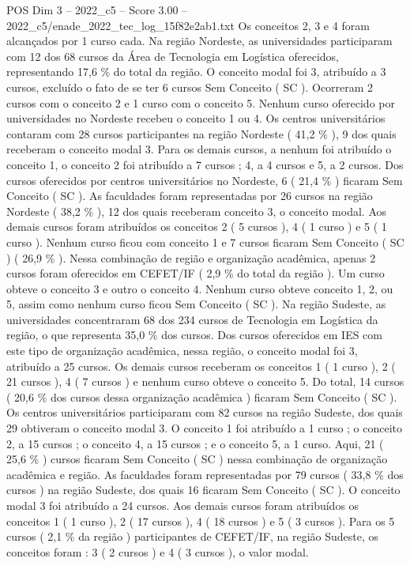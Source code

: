 \begin{textsample}{POS Dim 3 – 2022\_c5 – Score 3.00 – 2022\_c5/enade\_2022\_tec\_log\_15f82e2ab1.txt}
Os conceitos 2, 3 e 4 foram alcançados por 1 curso cada.
Na região Nordeste, as universidades participaram com 12 dos 68 cursos da Área de Tecnologia em Logística oferecidos, representando 17,6 \% do total da região.
O conceito modal foi 3, atribuído a 3 cursos, excluído o fato de se ter 6 cursos Sem Conceito ( SC ).
Ocorreram 2 cursos com o conceito 2 e 1 curso com o conceito 5.
Nenhum curso oferecido por universidades no Nordeste recebeu o conceito 1 ou 4.
Os centros universitários contaram com 28 cursos participantes na região Nordeste ( 41,2 \% ), 9 dos quais receberam o conceito modal 3.
Para os demais cursos, a nenhum foi atribuído o conceito 1, o conceito 2 foi atribuído a 7 cursos ; 4, a 4 cursos e 5, a 2 cursos.
Dos cursos oferecidos por centros universitários no Nordeste, 6 ( 21,4 \% ) ficaram Sem Conceito ( SC ).
As faculdades foram representadas por 26 cursos na região Nordeste ( 38,2 \% ), 12 dos quais receberam conceito 3, o conceito modal.
Aos demais cursos foram atribuídos os conceitos 2 ( 5 cursos ), 4 ( 1 curso ) e 5 ( 1 curso ).
Nenhum curso ficou com conceito 1 e 7 cursos ficaram Sem Conceito ( SC ) ( 26,9 \% ).
Nessa combinação de região e organização acadêmica, apenas 2 cursos foram oferecidos em CEFET/IF ( 2,9 \% do total da região ).
Um curso obteve o conceito 3 e outro o conceito 4.
Nenhum curso obteve conceito 1, 2, ou 5, assim como nenhum curso ficou Sem Conceito ( SC ).
Na região Sudeste, as universidades concentraram 68 dos 234 cursos de Tecnologia em Logística da região, o que representa 35,0 \% dos cursos.
Dos cursos oferecidos em IES com este tipo de organização acadêmica, nessa região, o conceito modal foi 3, atribuído a 25 cursos.
Os demais cursos receberam os conceitos 1 ( 1 curso ), 2 ( 21 cursos ), 4 ( 7 cursos ) e nenhum curso obteve o conceito 5.
Do total, 14 cursos ( 20,6 \% dos cursos dessa organização acadêmica ) ficaram Sem Conceito ( SC ).
Os centros universitários participaram com 82 cursos na região Sudeste, dos quais 29 obtiveram o conceito modal 3.
O conceito 1 foi atribuído a 1 curso ; o conceito 2, a 15 cursos ; o conceito 4, a 15 cursos ; e o conceito 5, a 1 curso.
Aqui, 21 ( 25,6 \% ) cursos ficaram Sem Conceito ( SC ) nessa combinação de organização acadêmica e região.
As faculdades foram representadas por 79 cursos ( 33,8 \% dos cursos ) na região Sudeste, dos quais 16 ficaram Sem Conceito ( SC ).
O conceito modal 3 foi atribuído a 24 cursos.
Aos demais cursos foram atribuídos os conceitos 1 ( 1 curso ), 2 ( 17 cursos ), 4 ( 18 cursos ) e 5 ( 3 cursos ).
Para os 5 cursos ( 2,1 \% da região ) participantes de CEFET/IF, na região Sudeste, os conceitos foram : 3 ( 2 cursos ) e 4 ( 3 cursos ), o valor modal.

\end{textsample}
